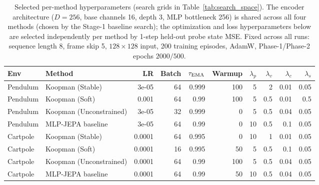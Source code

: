 \begin{table}[ht]
\caption{Selected per-method hyperparameters (search grids in Table~\ref{tab:search_space}). The encoder architecture ($D{=}256$, base channels 16, depth 3, MLP bottleneck 256) is shared across all four methods (chosen by the Stage-1 baseline search); the optimization and loss hyperparameters below are selected independently per method by 1-step held-out probe state MSE. Fixed across all runs: sequence length 8, frame skip 5, $128{\times}128$ input, 200 training episodes, AdamW, Phase-1/Phase-2 epochs $2000/500$.}
\label{tab:hyperparams}
\centering
\small
\begin{tabular}{@{}llrrrrrrrr@{}}
\toprule
\textbf{Env} & \textbf{Method} & \textbf{LR} & \textbf{Batch} & \textbf{$\tau_{\rm EMA}$} & \textbf{Warmup} & \textbf{$\lambda_p$} & \textbf{$\lambda_v$} & \textbf{$\lambda_c$} & \textbf{$\lambda_s$} \\
\midrule
Pendulum & Koopman (Stable) & 3e-05 & 64 & 0.999 & 100 & 5 & 2 & 0.01 & 0.05 \\
Pendulum & Koopman (Soft) & 0.001 & 64 & 0.99 & 100 & 5 & 0.5 & 0.01 & 0.5 \\
Pendulum & Koopman (Unconstrained) & 3e-05 & 32 & 0.999 & 0 & 5 & 0.5 & 0.04 & 0.05 \\
Pendulum & MLP-JEPA baseline & 3e-05 & 64 & 0.99 & 0 & 10 & 0.5 & 0.1 & 0.05 \\
\midrule
Cartpole & Koopman (Stable) & 0.0001 & 64 & 0.995 & 0 & 10 & 1 & 0.01 & 0.05 \\
Cartpole & Koopman (Soft) & 0.0001 & 16 & 0.995 & 50 & 5 & 0.5 & 0.1 & 0.05 \\
Cartpole & Koopman (Unconstrained) & 0.0001 & 64 & 0.99 & 100 & 5 & 0.5 & 0.04 & 0.05 \\
Cartpole & MLP-JEPA baseline & 0.0001 & 64 & 0.99 & 50 & 10 & 0.5 & 0.04 & 0.05 \\
\bottomrule
\end{tabular}
\end{table}
